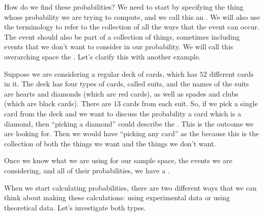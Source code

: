 \documentclass{ximera}
\begin{document}
How do we find these probabilities? We need to start by specifying the thing whose probability we are trying to compute, and we call this an . We will also use the terminology  to refer to the collection of all the ways that the event can occur. The event should also be part of a collection of things, sometimes including events that we don't want to consider in our probability. We will call this overarching space the . Let's clarify this with another example.

\begin{example}
Suppose we are considering a regular deck of cards, which has $52$ different cards in it. The deck has four types of cards, called suits, and the names of the suits are hearts and diamonds (which are red cards), as well as spades and clubs (which are black cards). There are $13$ cards from each suit. So, if we pick a single card from the deck and we want to discuss the probability a card which is a diamond, then ``picking a diamond'' could describe the . This is the outcome we are looking for. Then we would have ``picking any card'' as the  because this is the collection of both the things we want and the things we don't want.
\end{example}

Once we know what we are using for our sample space, the events we are considering, and all of their probabilities, we have a . 


When we start calculating probabilities, there are two different ways that we can think about making these calculations: using experimental data or using theoretical data. Let's investigate both types.
\end{document}
